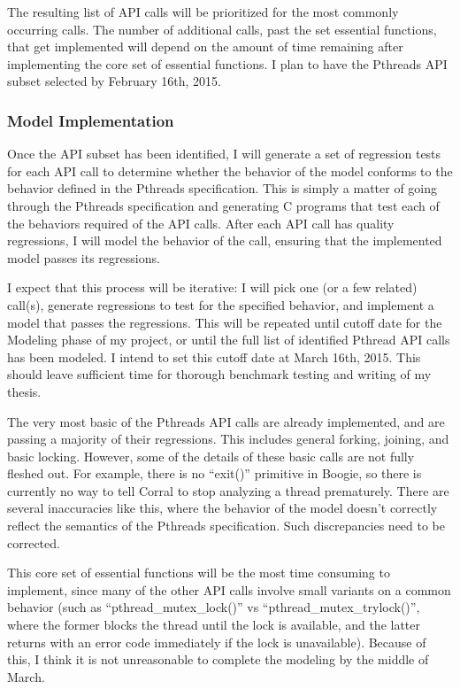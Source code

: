 \documentclass{scrartcl}
\begin{document}
The resulting list of API calls will be prioritized for the most commonly occurring calls.  The number of additional calls, past the set essential functions, that get implemented will depend on the amount of time remaining after implementing the core set of essential functions.  I plan to have the Pthreads API subset selected by February 16th, 2015.

\subsubsection{Model Implementation}

Once the API subset has been identified, I will generate a set of regression tests for each API call to determine whether the behavior of the model conforms to the behavior defined in the Pthreads specification.  This is simply a matter of going through the Pthreads specification and generating C programs that test each of the behaviors required of the API calls.  After each API call has quality regressions, I will model the behavior of the call, ensuring that the implemented model passes its regressions.

I expect that this process will be iterative: I will pick one (or a few related) call(s), generate regressions to test for the specified behavior, and implement a model that passes the regressions.  This will be repeated until cutoff date for the Modeling phase of my project, or until the full list of identified Pthread API calls has been modeled.  I intend to set this cutoff date at March 16th, 2015.  This should leave sufficient time for thorough benchmark testing and writing of my thesis.

The very most basic of the Pthreads API calls are already implemented, and are passing a majority of their regressions.  This includes general forking, joining, and basic locking.  However, some of the details of these basic calls are not fully fleshed out.  For example, there is no ``exit()'' primitive in Boogie, so there is currently no way to tell Corral to stop analyzing a thread prematurely.  There are several inaccuracies like this, where the behavior of the model doesn't correctly reflect the semantics of the Pthreads specification.  Such discrepancies need to be corrected.

This core set of essential functions will be the most time consuming to implement, since many of the other API calls involve small variants on a common behavior (such as ``pthread\_mutex\_lock()'' vs ``pthread\_mutex\_trylock()'', where the former blocks the thread until the lock is available, and the latter returns with an error code immediately if the lock is unavailable).  Because of this, I think it is not unreasonable to complete the modeling by the middle of March.
\end{document}
